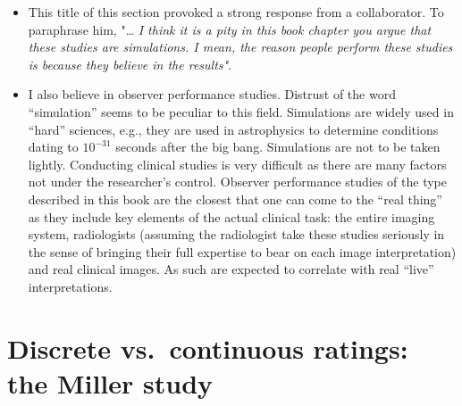 \documentclass[
]{book}
\begin{document}
\begin{itemize}
\item
  This title of this section provoked a strong response from a collaborator. To paraphrase him, "\ldots{} \emph{I think it is a pity in this book chapter you argue that these studies are simulations. I mean, the reason people perform these studies is because they believe in the results"}.
\item
  I also believe in observer performance studies. Distrust of the word ``simulation'' seems to be peculiar to this field. Simulations are widely used in ``hard'' sciences, e.g., they are used in astrophysics to determine conditions dating to \(10^{-31}\) seconds after the big bang. Simulations are not to be taken lightly. Conducting clinical studies is very difficult as there are many factors not under the researcher's control. Observer performance studies of the type described in this book are the closest that one can come to the ``real thing'' as they include key elements of the actual clinical task: the entire imaging system, radiologists (assuming the radiologist take these studies seriously in the sense of bringing their full expertise to bear on each image interpretation) and real clinical images. As such are expected to correlate with real ``live'' interpretations.
\end{itemize}

\hypertarget{binary-task-discrete-vs-continuous-ratings}{%
\section{Discrete vs.~continuous ratings: the Miller study}\label{binary-task-discrete-vs-continuous-ratings}}
\end{document}
